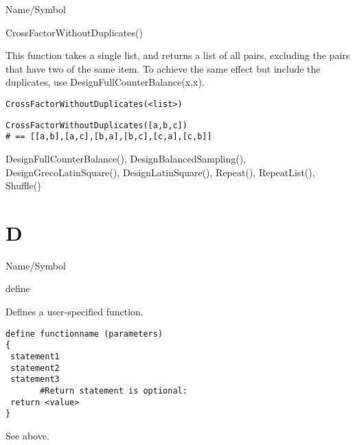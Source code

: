 \rl


\begin{desc}{Name/Symbol}
\item[Name/Symbol]  	CrossFactorWithoutDuplicates()

\item[Description] 	This function takes a single list, and returns a list of all 
			pairs, excluding the pairs that have two of the same item. 
			To achieve the same effect but include the duplicates, use 
			DesignFullCounterBalance(x,x).

\item[Usage]
\begin{verbatim}
CrossFactorWithoutDuplicates(<list>)
\end{verbatim}

\item[Example]
\begin{verbatim}
CrossFactorWithoutDuplicates([a,b,c]) 
# == [[a,b],[a,c],[b,a],[b,c],[c,a],[c,b]]
\end{verbatim}

\item[See Also]     	DesignFullCounterBalance(), DesignBalancedSampling(),
  		DesignGrecoLatinSquare(), DesignLatinSquare(), Repeat(),
  		RepeatList(), Shuffle()
\end{desc}

\rl
\section{D}
\rl


\begin{desc}{Name/Symbol}
\item[Name/Symbol]  	define

\item[Description]  	Defines a user-specified function.

\item[Usage]
\begin{verbatim}
define functionname (parameters)
{
 statement1
 statement2
 statement3
       #Return statement is optional:
 return <value>
}
\end{verbatim}

\item[Example]    	See above.

\item[See Also]
\end{desc}   	



